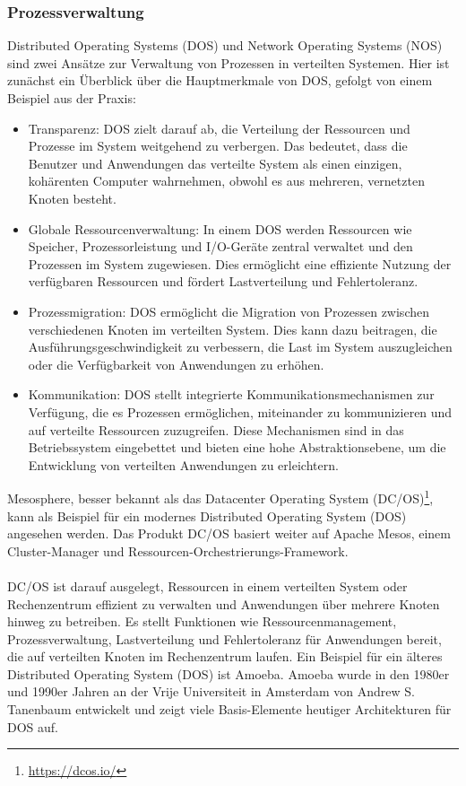 \subsubsection{Prozessverwaltung}
Distributed Operating Systems (DOS) und Network Operating Systems (NOS) sind zwei Ansätze zur Verwaltung von Prozessen in verteilten Systemen. Hier ist zunächst ein Überblick über die Hauptmerkmale von DOS, gefolgt von einem Beispiel aus der Praxis:
\begin{itemize}
\item Transparenz: DOS zielt darauf ab, die Verteilung der Ressourcen und Prozesse im System weitgehend zu verbergen. Das bedeutet, dass die Benutzer und Anwendungen das verteilte System als einen einzigen, kohärenten Computer wahrnehmen, obwohl es aus mehreren, vernetzten Knoten besteht.
\item Globale Ressourcenverwaltung: In einem DOS werden Ressourcen wie Speicher, Prozessorleistung und I/O-Geräte zentral verwaltet und den Prozessen im System zugewiesen. Dies ermöglicht eine effiziente Nutzung der verfügbaren Ressourcen und fördert Lastverteilung und Fehlertoleranz.
\item Prozessmigration: DOS ermöglicht die Migration von Prozessen zwischen verschiedenen Knoten im verteilten System. Dies kann dazu beitragen, die Ausführungsgeschwindigkeit zu verbessern, die Last im System auszugleichen oder die Verfügbarkeit von Anwendungen zu erhöhen.
\item Kommunikation: DOS stellt integrierte Kommunikationsmechanismen zur Verfügung, die es Prozessen ermöglichen, miteinander zu kommunizieren und auf verteilte Ressourcen zuzugreifen. Diese Mechanismen sind in das Betriebssystem eingebettet und bieten eine hohe Abstraktionsebene, um die Entwicklung von verteilten Anwendungen zu erleichtern.
\end{itemize}
Mesosphere, besser bekannt als das Datacenter Operating System (DC/OS)\footnote{\url{https://dcos.io/}}, kann als Beispiel für ein modernes Distributed Operating System (DOS) angesehen werden. Das Produkt DC/OS basiert weiter auf Apache Mesos, einem Cluster-Manager und Ressourcen-Orchestrierungs-Framework.
\\\\
DC/OS ist darauf ausgelegt, Ressourcen in einem verteilten System oder Rechenzentrum effizient zu verwalten und Anwendungen über mehrere Knoten hinweg zu betreiben. Es stellt Funktionen wie Ressourcenmanagement, Prozessverwaltung, Lastverteilung und Fehlertoleranz für Anwendungen bereit, die auf verteilten Knoten im Rechenzentrum laufen. Ein Beispiel für ein  älteres Distributed Operating System (DOS) ist Amoeba. Amoeba wurde in den 1980er und 1990er Jahren an der Vrije Universiteit in Amsterdam von Andrew S. Tanenbaum entwickelt und zeigt viele Basis-Elemente heutiger Architekturen für DOS auf. 
